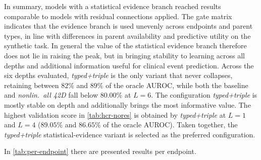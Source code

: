 In summary, models with a statistical evidence branch reached results
comparable to models with residual connections applied. 
The gate matrix indicates that the evidence branch is used
unevenly across endpoints and parent types, in line with differences in
parent availability and predictive utility on the synthetic task. 
In general the value of the statistical evidence branch therefore does not lie in raising the peak, but
in bringing stability to learning across all depths and additional information useful for clinical
event prediction.
Across the six depths evaluated, \emph{typed+triple} is the only variant that
never collapses, retaining between $82\%$ and $89\%$ of the oracle AUROC, while
both the baseline and \emph{nonlin.\ all 42D} fall below $80.00\%$ at $L=6$. 
The configuration \emph{typed+triple} is mostly stable on depth
and additionally brings the most informative value.
The highest validation score in \cref{tab:hcr-nores} is obtained by
\emph{typed+triple} at $L=1$ and $L=4$ ($89.05\%$ and $86.65\%$ of the oracle AUROC). 
Taken together, the \emph{typed+triple} statistical-evidence variant is selected as the preferred configuration.

In \cref{tab:per-endpoint} there are presented results per endpoint.

